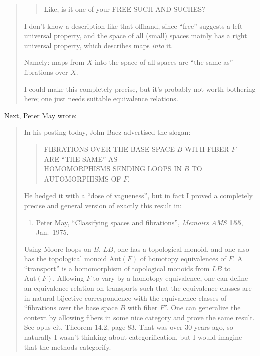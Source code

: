 \documentclass{article}
\def\tightlist{}
\begin{document}
\begin{quote}
\begin{quote}
Like, is it one of your FREE SUCH-AND-SUCHES?
\end{quote}

I don't know a description like that offhand, since ``free'' suggests a
left universal property, and the space of all (small) spaces mainly has
a right universal property, which describes maps \emph{into} it.

Namely: maps from \(X\) into the space of all spaces are ``the same as''
fibrations over \(X\).

I could make this completely precise, but it's probably not worth
bothering here; one just needs suitable equivalence relations.
\end{quote}

Next, Peter May wrote:

\begin{quote}
In his posting today, John Baez advertised the slogan:

\begin{quote}
FIBRATIONS OVER THE BASE SPACE \(B\) WITH FIBER \(F\)\\
ARE ``THE SAME'' AS\\
HOMOMORPHISMS SENDING LOOPS IN \(B\) TO AUTOMORPHISMS OF \(F\).
\end{quote}

He hedged it with a ``dose of vagueness'', but in fact I proved a
completely precise and general version of exactly this result in:

\begin{enumerate}
\def\labelenumi{\arabic{enumi})}
\setcounter{enumi}{15}
\tightlist
\item
  Peter May, ``Classifying spaces and fibrations'', \emph{Memoirs AMS}
  \textbf{155}, Jan.~1975.
\end{enumerate}

Using Moore loops on \(B\), \(LB\), one has a topological monoid, and
one also has the topological monoid \(\mathrm{Aut}(F)\) of homotopy
equivalences of \(F\). A ``transport'' is a homomorphism of topological
monoids from \(LB\) to \(\mathrm{Aut}(F)\). Allowing \(F\) to vary by a
homotopy equivalence, one can define an equivalence relation on
transports such that the equivalence classes are in natural bijective
correspondence with the equivalence classes of ``fibrations over the
base space \(B\) with fiber \(F\)''. One can generalize the context by
allowing fibers in some nice category and prove the same result. See
opus cit, Theorem 14.2, page 83. That was over 30 years ago, so
naturally I wasn't thinking about categorification, but I would imagine
that the methods categorify.
\end{quote}
\end{document}
